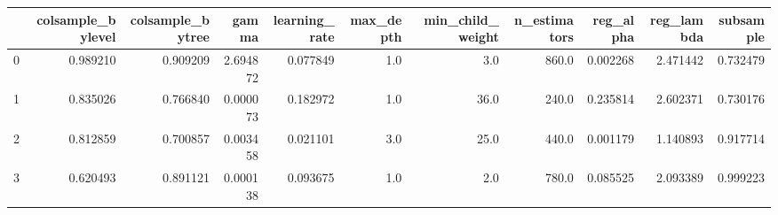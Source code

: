 \begin{tabular}{lrrrrrrrrrr}
\toprule
{} &  colsample\_bylevel &  colsample\_bytree &     gamma &  learning\_rate &  max\_depth &  min\_child\_weight &  n\_estimators &  reg\_alpha &  reg\_lambda &  subsample \\
\midrule
0 &           0.989210 &          0.909209 &  2.694872 &       0.077849 &        1.0 &               3.0 &         860.0 &   0.002268 &    2.471442 &   0.732479 \\
1 &           0.835026 &          0.766840 &  0.000073 &       0.182972 &        1.0 &              36.0 &         240.0 &   0.235814 &    2.602371 &   0.730176 \\
2 &           0.812859 &          0.700857 &  0.003458 &       0.021101 &        3.0 &              25.0 &         440.0 &   0.001179 &    1.140893 &   0.917714 \\
3 &           0.620493 &          0.891121 &  0.000138 &       0.093675 &        1.0 &               2.0 &         780.0 &   0.085525 &    2.093389 &   0.999223 \\
\bottomrule
\end{tabular}
